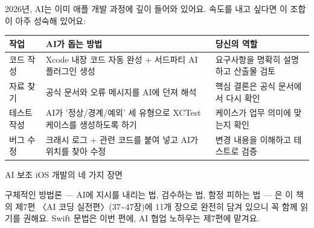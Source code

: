 
2026년, AI는 이미 애플 개발 과정에 깊이 들어와 있어요. 속도를 내고 싶다면 이 조합이 아주 성숙해 있어요:

\begin{center}
\begin{tabularx}{\linewidth}{|X|X|X|}
\hline
\textbf{작업} & \textbf{AI가 돕는 방법} & \textbf{당신의 역할} \tabularnewline
\hline
코드 작성 & Xcode 내장 코드 자동 완성 + 서드파티 AI 플러그인 생성 & 요구사항을 명확히 설명하고 산출물 검토 \tabularnewline
자료 찾기 & 공식 문서와 오류 메시지를 AI에 던져 해석 & 핵심 결론은 공식 문서에서 다시 확인 \tabularnewline
테스트 작성 & AI가 '정상/경계/예외' 세 유형으로 XCTest 케이스를 생성하도록 하기 & 케이스가 업무 의미에 맞는지 확인 \tabularnewline
버그 수정 & 크래시 로그 + 관련 코드를 붙여 넣고 AI가 위치를 찾아 수정 & 변경 내용을 이해하고 테스트로 검증 \tabularnewline
\hline
\end{tabularx}
\end{center}

\begin{center}\small\color{gray}AI 보조 iOS 개발의 네 가지 장면\end{center}

구체적인 방법론 — AI에 지시를 내리는 법, 검수하는 법, 함정 피하는 법 — 은 이 책의 제7편 〈AI 코딩 실전편〉(37\textasciitilde{}47장)에 11개 장으로 완전히 담겨 있으니 꼭 함께 읽기를 권해요. Swift 문법은 이번 편에, AI 협업 노하우는 제7편에 맡겨요.

